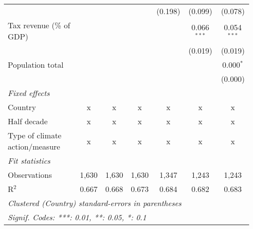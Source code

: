 \begin{tabular}{lcccccc}
                                                             &         &         &                & (0.198)        & (0.099)        & (0.078)\\   
   Tax revenue (\% of GDP)                                   &         &         &                &                & 0.066$^{***}$  & 0.054$^{***}$\\   
                                                             &         &         &                &                & (0.019)        & (0.019)\\   
   Population total                                          &         &         &                &                &                & 0.000$^{*}$\\   
                                                             &         &         &                &                &                & (0.000)\\   
   \emph{Fixed effects}\\
   Country                                                   & x       & x       & x              & x              & x              & x\\  
   Half decade                                               & x       & x       & x              & x              & x              & x\\  
   Type of climate action/measure                            & x       & x       & x              & x              & x              & x\\  
   \midrule \emph{Fit statistics}\\
   Observations                                              & 1,630   & 1,630   & 1,630          & 1,347          & 1,243          & 1,243\\  
   R$^2$                                                     & 0.667   & 0.668   & 0.673          & 0.684          & 0.682          & 0.683\\  
   \midrule
   \multicolumn{7}{l}{\emph{Clustered (Country) standard-errors in parentheses}}\\
   \multicolumn{7}{l}{\emph{Signif. Codes: ***: 0.01, **: 0.05, *: 0.1}}\\
\end{tabular}
\par\endgroup


